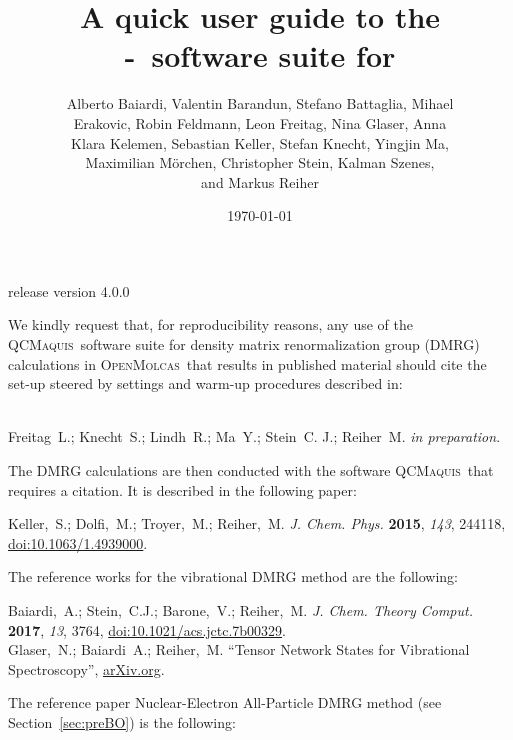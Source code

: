 \documentclass[bibliography=totoc,12pt,a4paper]{scrartcl}
\title{A quick user guide to the\\ \scine-\qcm\ software suite for \mol}
\author{Alberto Baiardi, Valentin Barandun, Stefano Battaglia, Mihael \\ Erakovic, Robin Feldmann, Leon Freitag, Nina Glaser, Anna \\ Klara Kelemen, Sebastian Keller, Stefan Knecht, Yingjin Ma, \\ Maximilian M\"orchen, Christopher Stein, Kalman Szenes, \\ and Markus Reiher}
\date{\today}
\newcommand{\relv}{release version 4.0.0}
\newcommand{\mol}{\textsc{OpenMolcas}}
\newcommand{\qcm}{\textsc{QCMaquis}}
\begin{document}


\maketitle
\thispagestyle{empty}
\begin{center}
\end{center}
\vspace{-1.85cm}
\centerline{\large{\relv}}

\vspace{2cm}

\noindent We kindly request that, for reproducibility reasons, any use of the \qcm\ software suite for density matrix renormalization group (DMRG) calculations in \mol\ that results in published material should cite the set-up steered by settings and warm-up procedures described in:

\begin{framed}
  \\
  \noindent Freitag~L.; Knecht~S.; Lindh~R.; Ma~Y.; Stein~C. J.; Reiher~M. \emph{in preparation}.
\end{framed}

\noindent The DMRG calculations are then conducted with the software \qcm\ that requires a citation.
It is described in the following paper:

\begin{framed}
\noindent Keller,~S.; Dolfi,~M.; Troyer,~M.; Reiher,~M. \emph{J. Chem. Phys.}
  \textbf{2015}, \emph{143}, 244118, \href{https://doi.org/10.1063/1.4939000}{doi:10.1063/1.4939000}.
\end{framed}

The reference works for the vibrational DMRG method are the following:

\begin{framed}
  \noindent Baiardi,~A.; Stein,~C.J.; Barone,~V.; Reiher,~M. \emph{J. Chem. Theory Comput.}
  \textbf{2017}, \emph{13}, 3764,   \href{https://doi.org/10.1021/acs.jctc.7b00329}{doi:10.1021/acs.jctc.7b00329}. \\
  \noindent Glaser,~N.; Baiardi~A.; Reiher,~M. ``Tensor Network States for Vibrational Spectroscopy'', \href{https://arxiv.org/abs/2109.08961}{arXiv.org}.
\end{framed}

The reference paper Nuclear-Electron All-Particle DMRG method (see Section~\ref{sec:preBO}) is the following:
\end{document}

